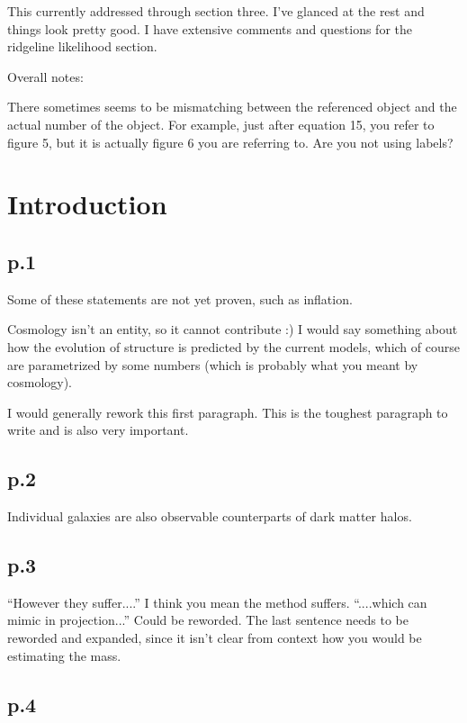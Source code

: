 \documentclass[12pt]{article}
\begin{document}
This currently addressed through section three. I've glanced at the
rest and things look pretty good.  I have extensive comments and
questions for the ridgeline likelihood section.

Overall notes:

There sometimes seems to be mismatching between the referenced object
and the actual number of the object. For example, just after equation
15, you refer to figure 5, but it is actually figure 6 you are referring
to.  Are you not using labels?


\section{Introduction}

\subsection*{p.1}

Some of these statements are not yet proven, such as inflation. 

Cosmology isn't an entity, so it cannot contribute :) I would say something
about how the evolution of structure is predicted by the current models, which
of course are parametrized by some numbers (which is probably what you meant by
cosmology).

I would generally rework this first paragraph.  This is the toughest paragraph
to write and is also very important.

\subsection*{p.2}

Individual galaxies are also observable counterparts of dark matter halos.

\subsection*{p.3}

``However they suffer....''  I think you mean the method suffers. 
``....which can mimic in projection...''  Could be reworded.
The last sentence needs to be reworded and expanded, since it isn't
clear from context how you would be estimating the mass.

\subsection*{p.4}
\end{document}
